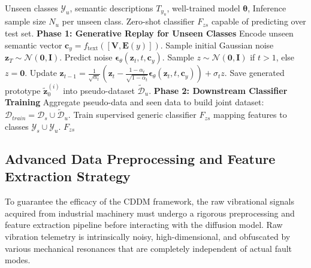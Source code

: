 \begin{algorithm}[H]
\caption{Zero-Shot Inference \& Diagnosis Procedure}
\label{alg:inference}
\begin{algorithmic}[1]
\REQUIRE Unseen classes $\mathcal{Y}_u$, semantic descriptions $T_{y_u}$, well-trained model $\boldsymbol{\theta}$, Inference sample size $N_u$ per unseen class.
\ENSURE Zero-shot classifier $F_{zs}$ capable of predicting over test set.
\STATE \textbf{Phase 1: Generative Replay for Unseen Classes}
    \STATE Encode unseen semantic vector $\mathbf{c}_y = f_{\text{text}}([\mathbf{V}, \mathbf{E}(y)])$.
        \STATE Sample initial Gaussian noise $\mathbf{z}_T \sim \mathcal{N}(\mathbf{0}, \mathbf{I})$.
            \STATE Predict noise $\boldsymbol{\epsilon}_\theta(\mathbf{z}_t, t, \mathbf{c}_y)$.
            \STATE Sample $z \sim \mathcal{N}(\mathbf{0}, \mathbf{I})$ if $t > 1$, else $z = \mathbf{0}$.
            \STATE Update $\mathbf{z}_{t-1} = \frac{1}{\sqrt{\alpha_t}} \left( \mathbf{z}_t - \frac{1 - \alpha_t}{\sqrt{1 - \bar{\alpha}_t}} \boldsymbol{\epsilon}_\theta(\mathbf{z}_t, t, \mathbf{c}_y) \right) + \sigma_t z$.
        \ENDFOR
        \STATE Save generated prototype $\tilde{\mathbf{z}}_0^{(i)}$ into pseudo-dataset $\widetilde{\mathcal{D}}_u$.
    \ENDFOR
\ENDFOR
\STATE \textbf{Phase 2: Downstream Classifier Training}
\STATE Aggregate pseudo-data and seen data to build joint dataset: $\mathcal{D}_{train} = \mathcal{D}_s \cup \widetilde{\mathcal{D}}_u$.
\STATE Train supervised generic classifier $F_{zs}$ mapping features to classes $\mathcal{Y}_s \cup \mathcal{Y}_u$.
\RETURN $F_{zs}$
\end{algorithmic}
\end{algorithm}


\subsection{Advanced Data Preprocessing and Feature Extraction Strategy}
\label{subsec:preprocessing}
To guarantee the efficacy of the CDDM framework, the raw vibrational signals acquired from industrial machinery must undergo a rigorous preprocessing and feature extraction pipeline before interacting with the diffusion model. Raw vibration telemetry is intrinsically noisy, high-dimensional, and obfuscated by various mechanical resonances that are completely independent of actual fault modes. 

